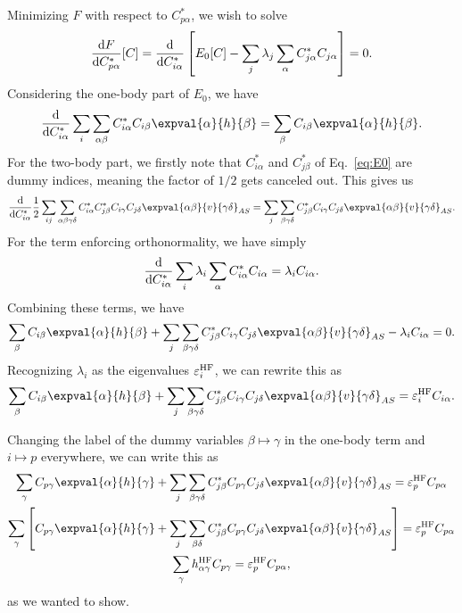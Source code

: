 Minimizing $F$ with respect to $C^*_{p\alpha}$, we wish to solve
\begin{equation*}
    \frac{\mathop{}\!\mathrm{d} F}{\mathop{}\!\mathrm{d} C^*_{p\alpha}}[C] = \frac{\mathop{}\!\mathrm{d}}{\mathop{}\!\mathrm{d} C_{i \alpha}^*} \left[ E_0[C] - \sum_j \lambda_j \sum_{\alpha} C_{j \alpha}^* C_{j \alpha} \right] = 0.
\end{equation*}
Considering the one-body part of $E_0$, we have
\begin{equation*}
    \frac{\diff}{\diff C_{i \alpha}^*} \sum_{i} \sum_{\alpha\beta} C_{i \alpha}^* C_{i \beta}  \expval{\alpha}{h}{\beta} = \sum_{\beta} C_{i \beta} \expval{\alpha}{h}{\beta}.
\end{equation*}
For the two-body part, we firstly note that $C_{i \alpha}^*$ and $C_{j \beta}^*$ of Eq.~\eqref{eq:E0} are dummy indices, meaning the factor of $1/2$ gets canceled out.
This gives us
\begin{equation*}
    \frac{\diff}{\diff C_{i \alpha}^*} \frac{1}{2} \sum_{ij} \sum_{\alpha\beta\gamma\delta} C_{i \alpha}^* C_{j \beta}^* C_{i \gamma} C_{j \delta} \expval{\alpha\beta}{v}{\gamma\delta}_{AS} = \sum_j \sum_{\beta\gamma\delta} C_{j \beta}^* C_{i \gamma} C_{j \delta} \expval{\alpha\beta}{v}{\gamma\delta}_{AS}.
\end{equation*}
For the term enforcing orthonormality, we have simply
\begin{equation*}
    \frac{\mathop{}\!\mathrm{d}}{\mathop{}\!\mathrm{d} C_{i \alpha}^*} \sum_{i} \lambda_i \sum_{\alpha} C_{i \alpha}^* C_{i \alpha} = \lambda_i C_{i \alpha}.
\end{equation*}
Combining these terms, we have
\begin{equation*}
    \sum_{\beta} C_{i \beta} \expval{\alpha}{h}{\beta} + \sum_j \sum_{\beta\gamma\delta} C_{j \beta}^* C_{i \gamma} C_{j \delta} \expval{\alpha\beta}{v}{\gamma\delta}_{AS} - \lambda_i C_{i \alpha} = 0.
\end{equation*}
Recognizing $\lambda_i$ as the eigenvalues $\varepsilon_i^{\mathrm{HF}}$, we can rewrite this as
\begin{equation*}
    \sum_{\beta} C_{i \beta} \expval{\alpha}{h}{\beta} + \sum_j \sum_{\beta\gamma\delta} C_{j \beta}^* C_{i \gamma} C_{j \delta} \expval{\alpha\beta}{v}{\gamma\delta}_{AS} = \varepsilon_i^\HF C_{i \alpha}.
\end{equation*}

Changing the label of the dummy variables $\beta \mapsto \gamma$ in the one-body term and $i \mapsto p$ everywhere, we can write this as
\begin{gather*}
    \sum_{\gamma} C_{p \gamma} \expval{\alpha}{h}{\gamma} + \sum_j \sum_{\beta\gamma\delta} C_{j \beta}^* C_{p \gamma} C_{j \delta} \expval{\alpha\beta}{v}{\gamma\delta}_{AS} = \varepsilon_p^\HF C_{p \alpha} \\
    \sum_{\gamma}  \left[ C_{p \gamma} \expval{\alpha}{h}{\gamma} + \sum_j \sum_{\beta\delta} C_{j \beta}^* C_{p \gamma} C_{j \delta} \expval{\alpha\beta}{v}{\gamma\delta}_{AS} \right] = \varepsilon_p^\HF C_{p \alpha} \\
    \sum_{\gamma} h_{\alpha\gamma}^\HF C_{p \gamma} = \varepsilon_p^\HF C_{p \alpha},
\end{gather*}
as we wanted to show.
